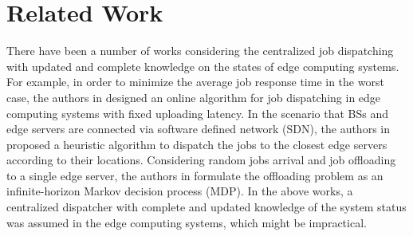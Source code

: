 \section{Related Work}
\label{sec:review}

There have been a number of works considering the centralized job dispatching with updated and complete knowledge on the states of edge computing systems.
For example, in order to minimize the average job response time in the worst case, the authors in \cite{tan-online} designed an online algorithm for job dispatching in edge computing systems with fixed uploading latency.
In the scenario that BSs and edge servers are connected via software defined network (SDN), the authors in \cite{IOTJ18-FanQ} proposed a heuristic algorithm to dispatch the jobs to the closest edge servers according to their locations.
Considering random jobs arrival and job offloading to a single edge server, the authors in \cite{mdp-globecom,mdp-tvt} formulate the offloading problem as an infinite-horizon Markov decision process (MDP).
In the above works, a centralized dispatcher with complete and updated knowledge of the system status was assumed in the edge computing systems, which might be impractical.

